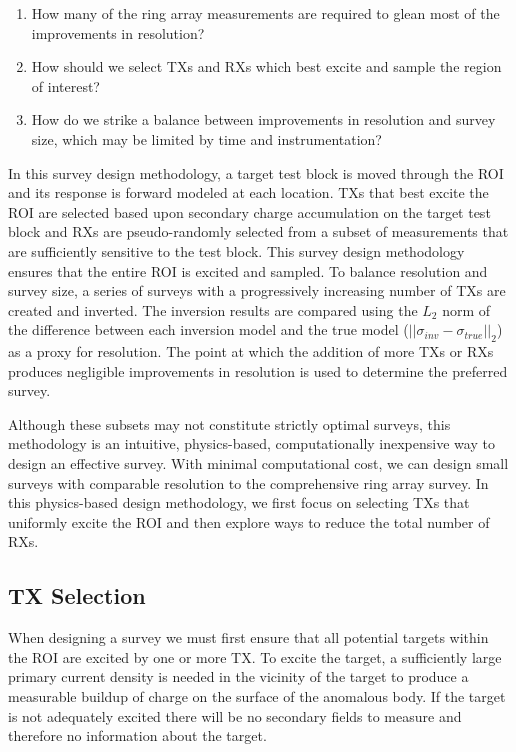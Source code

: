 \documentclass[preprint,authoryear,12pt]{elsarticle}
\begin{document}
\begin{enumerate}
   \item How many of the ring array measurements are required to glean most of the improvements in resolution?
   \item How should we select TXs and RXs which best excite and sample the region of interest?
   \item How do we strike a balance between improvements in resolution and survey size, which may be limited by time and instrumentation?
\end{enumerate}

In this survey design methodology, a target test block is moved through the ROI and its response is forward modeled at each location. TXs that best excite the ROI are selected based upon secondary charge accumulation on the target test block and RXs are pseudo-randomly selected from a subset of measurements that are sufficiently sensitive to the test block. This survey design methodology ensures that the entire ROI is excited and sampled. To balance resolution and survey size, a series of surveys with a progressively increasing number of TXs are created and inverted. The inversion results are compared using the $L_2$ norm of the difference between each inversion model and the true model ($\left|| \sigma_{inv} - \sigma_{true} \right||_2$) as a proxy for resolution. The point at which the addition of more TXs or RXs produces negligible improvements in resolution is used to determine the preferred survey.

Although these subsets may not constitute strictly optimal surveys, this methodology is an intuitive, physics-based, computationally inexpensive way to design an effective survey. With minimal computational cost, we can design small surveys with comparable resolution to the comprehensive ring array survey. In this physics-based design methodology, we first focus on selecting TXs that uniformly excite the ROI and then explore ways to reduce the total number of RXs.

\subsection{TX Selection}
\label{sec:RingArray_SurveyDesign_TXSelection}

When designing a survey we must first ensure that all potential targets within the ROI are excited by one or more TX. To excite the target, a sufficiently large primary current density is needed in the vicinity of the target to produce a measurable buildup of charge on the surface of the anomalous body. If the target is not adequately excited there will be no secondary fields to measure and therefore no information about the target.
\end{document}
